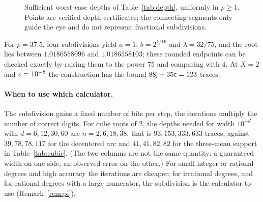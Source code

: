 \begin{figure}[h]
\centering\figDepth
\caption{Sufficient worst-case depths of Table~\ref{tab:depth}, uniformly in $p\ge1$. Points are
verified depth certificates; the connecting segments only guide the eye and do not represent fractional
subdivisions.}\label{fig:depth}
\end{figure}

For $p=37.5$, four subdivisions yield $a=1$, $b=2^{1/16}$ and $\lambda=32/75$, and the root lies between
$1.0186558096$ and $1.0186558103$; these rounded endpoints can be checked exactly by raising them to the
power $75$ and comparing with $4$. At $X=2$ and $\varepsilon=10^{-8}$ the construction has the bound
$88\mathsf{j}+35\mathsf{c}=123$ traces.

\paragraph{When to use which calculator.}
The subdivision gains a fixed number of bits per step, the iterations multiply the number of correct
digits. For cube roots of $2$, the depths needed for width $10^{-d}$ with $d=6,12,30,60$ are
$n=2,6,18,38$, that is $93,153,333,633$ traces, against $39,78,78,117$ for the decentered arc and
$41,41,82,82$ for the three-mean support in Table~\ref{tab:cubic}. (The two columns are not the same quantity: a guaranteed width on one side, an
observed error on the other.) For small integer or rational degrees and high accuracy the iterations
are cheaper; for irrational degrees, and for rational degrees with a large numerator, the subdivision
is the calculator to use (Remark~\ref{rem:pi}).
